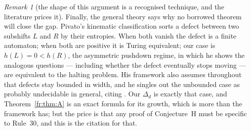 \documentclass[11pt]{article}
\theoremstyle{definition}
\theoremstyle{remark}
\newtheorem{remark}[theorem]{Remark}
\begin{document}
\begin{remark}[the shape of this argument is a recognised technique, and the literature prices it]
Finally, the general theory says why no borrowed theorem will close the gap. Pivato's kinematic
classification \cite{PivatoDefect} sorts a defect between two subshifts $L$ and $R$ by their entropies.
When both vanish the defect is a finite automaton; when both are positive it is Turing equivalent; our
case is $h(L)=0<h(R)$, the asymmetric pushdown regime, in which he shows the analogous questions ---
including whether the defect eventually stops moving --- are equivalent to the halting problem. His
framework also assumes throughout that defects stay bounded in width, and he singles out the unbounded
case as probably undecidable in general, citing \cite{Sutner}. Our $\Delta_d$ is exactly that case, and
Theorem~\ref{fr:thm:A} is an exact formula for its growth, which is more than the framework has; but the
price is that any proof of Conjecture~H must be specific to Rule~30, and this is the citation for that.
\end{remark}
\end{document}
